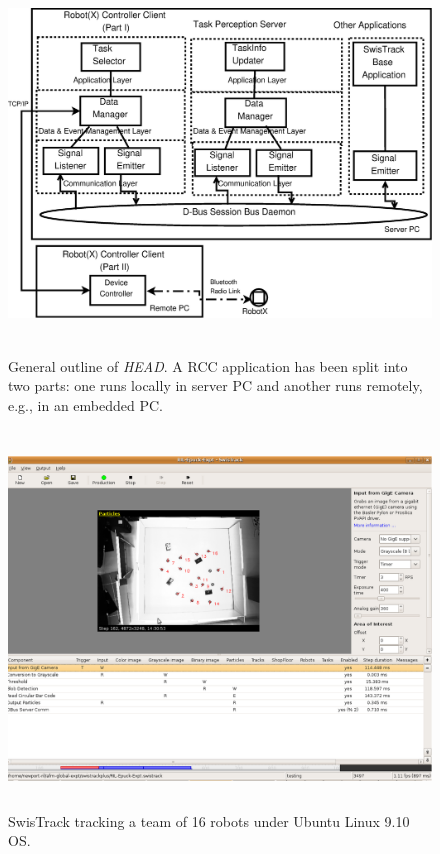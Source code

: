 \documentclass[final,5p,times,twocolumn]{elsarticle}
\begin{document}
\begin{figure}
\begin{center}
\includegraphics[width=0.7\linewidth,height=10cm]{./images/concrete-arch} 
\caption{General outline of {\em HEAD}. A RCC application has been split into two parts: one runs locally in server PC and another runs remotely, e.g., in an embedded PC.} 
\label{fig:concrete-arch}
\end{center}
\end{figure}
\begin{figure}
\centering
\includegraphics[width=0.7\linewidth,height=10cm]
{./images/SwisTrackScreenshot.eps}
\caption{SwisTrack tracking a team of 16 robots under Ubuntu Linux 9.10 OS.}
\label{fig:swistrack-screenshot} 
\end{figure}
\end{document}
